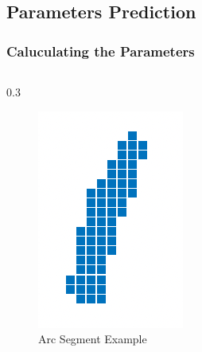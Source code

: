 \documentclass{beamer}
\begin{document}
    \subsection{Parameters Prediction}
    \begin{frame}
        \frametitle{Caluculating the Parameters}
    
        \begin{columns}
            \begin{column}
                {0.3\linewidth}
                \begin{figure}
                    \includegraphics[width=\linewidth]{pic/arc.png}
                    \caption{Arc Segment Example}
                \end{figure}
            \end{column}
            

\end{columns}
\end{frame}
\end{document}
